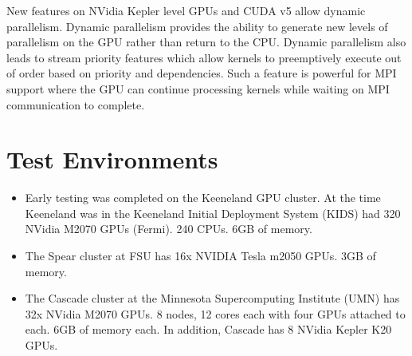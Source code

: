 \documentclass{report}
\begin{document}
New features on NVidia Kepler level GPUs and CUDA v5 allow dynamic parallelism. Dynamic parallelism provides the ability to generate new levels of parallelism on the GPU rather than return to the CPU.  Dynamic parallelism also leads to stream priority features which allow kernels to preemptively execute out of order based on priority and dependencies. Such a feature is powerful for MPI support where the GPU can continue processing kernels while waiting on MPI communication to complete. 



\section{Test Environments}

\begin{itemize}	
\item Early testing was completed on the Keeneland GPU cluster. At the time Keeneland was in the Keeneland Initial Deployment System (KIDS) had 320 NVidia M2070 GPUs (Fermi). 240 CPUs. 6GB of memory. 
\item The Spear cluster at FSU has 16x NVIDIA Tesla m2050 GPUs. 3GB of memory. 
\item The Cascade cluster at the Minnesota Supercomputing Institute (UMN) has 32x NVidia M2070 GPUs. 8 nodes, 12 cores each with four GPUs attached to each. 6GB of memory each. In addition, Cascade has 8 NVidia Kepler K20 GPUs. 
\end{itemize}
\end{document}
